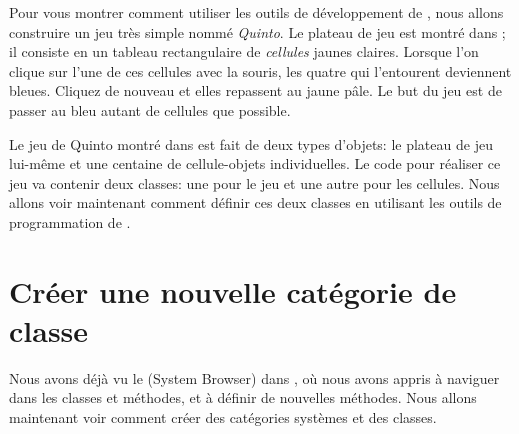 \documentclass[a4paper,10pt,twoside]{book}
\begin{document}
Pour vous montrer comment utiliser les outils de développement de
\sq, nous allons construire un jeu très simple nommé
\emph{Quinto}.  Le plateau de jeu est montré dans
; il consiste en un tableau rectangulaire de
\emph{cellules} jaunes claires.  Lorsque l'on clique sur l'une de ces
cellules avec la souris, les quatre qui l'entourent deviennent
bleues. Cliquez de nouveau et elles repassent au jaune p\^ale. Le but du 
jeu est de passer au bleu autant de cellules que possible.

Le jeu de Quinto montré dans  est fait de deux types d'objets: le plateau de jeu lui-m\^eme et une centaine de cellule-objets individuelles. Le code \sq pour réaliser ce jeu va contenir deux classes: une pour le jeu et une autre pour les cellules.
Nous allons voir maintenant comment définir ces deux classes en utilisant les outils de programmation de \sq.

\section{Créer une nouvelle catégorie de classe}

Nous avons déjà vu le  (System Browser)
dans , o\`u nous avons appris à naviguer dans les classes
et méthodes, et à définir de nouvelles méthodes.
Nous allons maintenant voir comment créer des catégories systèmes et des classes.

\end{document}
